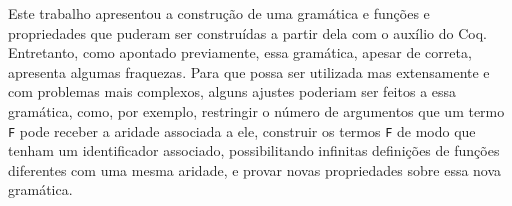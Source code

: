 \documentclass{article}
\begin{document}
Este trabalho apresentou a construção de uma gramática e funções e propriedades que puderam ser construídas a partir dela com o auxílio do Coq. Entretanto, como apontado previamente, essa gramática, apesar de correta, apresenta algumas fraquezas. Para que possa ser utilizada mas extensamente e com problemas mais complexos, alguns ajustes poderiam ser feitos a essa gramática, como, por exemplo, restringir o número de argumentos que um termo \texttt{F} pode receber a aridade associada a ele, construir os termos \texttt{F} de modo que tenham um identificador associado, possibilitando infinitas definições de funções diferentes com uma mesma aridade, e provar novas propriedades sobre essa nova gramática.


\nocite{*}


\end{document}
